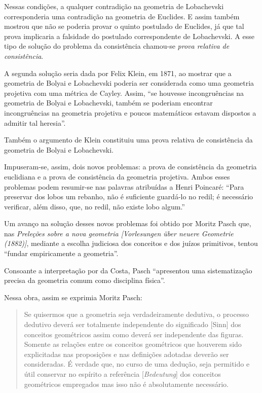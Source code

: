 \documentclass{hipatia}
\begin{document}
Nessas condições, a qualquer contradição na geometria de Lobachevski corresponderia uma contradição na geometria de Euclides. E assim também mostrou que não se poderia provar o quinto postulado de Euclides, já que tal prova implicaria a falsidade do postulado correspondente de Lobachevski. A esse tipo de solução do problema da consistência chamou-se \emph{prova relativa de consistência}.  \cite[p. 388]{kneale}\cite[p. 325]{fraenkel1963}

A segunda solução seria dada por Felix Klein, em 1871, ao  mostrar que a geometria de Bolyai e Lobachevski poderia ser considerada como uma geometria projetiva com uma métrica de Cayley. Assim, ``se houvesse incongruências na geometria de Bolyai e Lobachevski, também se poderiam encontrar incongruências na geometria projetiva e poucos matemáticos estavam dispostos a admitir tal heresia''. \cite[p. 178]{struik1987}  

Também o argumento de Klein constituiu uma prova relativa de consistência da geometria de Bolyai e Lobachevski.

Impuseram-se, assim, dois novos problemas: a prova de consistência da geometria euclidiana e a prova de consistência da geometria projetiva. Ambos esses problemas podem resumir-se nas palavras atribuídas a Henri Poincaré: ``Para preservar dos lobos um rebanho, não é suficiente guardá-lo no redil; é necessário verificar, além disso, que, no redil, não existe lobo algum.''  \cite[p. 59]{babini1974}

Um avanço na solução desses novos problemas foi obtido por Moritz Pasch que, nas \emph{Preleções sobre a nova geometria [Vorlesungen über neuere Geometrie (1882)]}, mediante a escolha judiciosa dos conceitos e dos juízos primitivos, tentou ``fundar empiricamente a geometria''. \cite[p. 151]{pasch1924} 

Consoante a interpretação por da Costa, Pasch ``apresentou uma sistematização precisa da geometria comum como disciplina física''.  \cite[p. 193]{costa1994}

Nessa obra, assim se exprimia Moritz Pasch: 
\begin{quote}   
Se quisermos que a geometria seja verdadeiramente dedutiva, o processo dedutivo deverá ser totalmente independente do significado [Sinn] dos conceitos geométricos assim como deverá ser independente das figuras. Somente as relações entre os conceitos geométricos que houverem sido explicitadas nas proposições e nas definições adotadas deverão ser consideradas. É verdade que, no curso de uma dedução, seja permitido e útil conservar no espírito a referência [\emph{Bedeutung}] dos conceitos geométricos empregados mas isso não é absolutamente necessário.  
\cite[\emph{apud}, p. 283]{bottazzini2001}\cite[\emph{apud}, p. 654]{gandon2005}
\end{quote}
\end{document}
